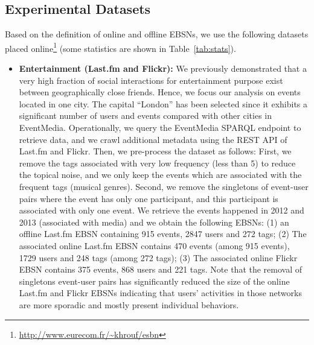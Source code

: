 \subsection{Experimental Datasets}
Based on the definition of online and offline EBSNs, we use the following datasets placed online\footnote{\url{http://www.eurecom.fr/~khrouf/esbn}} (some statistics are shown in Table~\ref{tab:stats}).

\begin{itemize}
\item \textbf{Entertainment (Last.fm and Flickr):} We previously demonstrated that a very high fraction of social interactions for entertainment purpose  exist between geographically close friends. Hence, we focus our analysis on events located in one city. The capital ``London'' has been selected since it exhibits a significant number of users and events compared with other cities in EventMedia. Operationally, we query the EventMedia SPARQL endpoint to retrieve data, and we crawl additional metadata using the REST API of Last.fm and Flickr. Then, we pre-process the dataset as follows: First, we remove the tags associated with very low frequency (less than 5) to reduce the topical noise, and we only keep the events which are associated with the frequent tags (musical genres). Second, we remove the singletons of event-user pairs where the event has only one participant, and this participant is associated with only one event. We retrieve the events happened in 2012 and 2013 (associated with media) and we obtain the following EBSNs: (1) an offline Last.fm EBSN containing 915 events, 2847 users and 272 tags; (2) The associated online Last.fm EBSN contains 470 events (among 915 events), 1729 users and 248 tags (among 272 tags); (3) The associated online Flickr EBSN contains 375 events, 868 users and 221 tags. Note that the removal of singletons event-user pairs has significantly reduced the size of the online Last.fm and Flickr EBSNs indicating that users' activities in those networks are more sporadic and mostly present individual behaviors.


\end{itemize}
